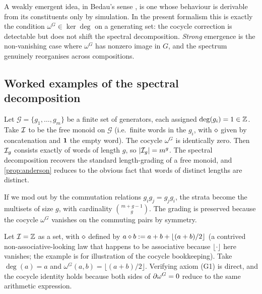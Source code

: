 \begin{remark}
\label{rem:bedau}
A weakly emergent idea, in Bedau's sense \cite{Bedau1997}, is one whose
behaviour is derivable from its constituents only by simulation. In the
present formalism this is exactly the condition $\omega^G \in \ker\deg$
on a generating set: the cocycle correction is detectable but does not
shift the spectral decomposition. \emph{Strong} emergence is the
non-vanishing case where $\omega^G$ has nonzero image in $G$, and the
spectrum genuinely reorganises across compositions.
\end{remark}

\subsection*{Worked examples of the spectral decomposition}

\begin{example}
\label{ex:free-graded}
Let $\mathcal{G} = \{g_1,\dots,g_m\}$ be a finite set of generators,
each assigned $\deg(g_i) = 1\in\mathbb{Z}$. Take $\mathcal{I}$ to be the free monoid
on $\mathcal{G}$ (i.e.\ finite words in the $g_i$, with $\mathbin{\diamond}$ given
by concatenation and $\mathbf{1}$ the empty word). The cocycle
$\omega^G$ is identically zero. Then $\mathcal{I}_g$ consists exactly of
words of length $g$, so $|\mathcal{I}_g| = m^g$. The spectral decomposition
recovers the standard length-grading of a free monoid, and
\cref{prop:anderson} reduces to the obvious fact that words of
distinct lengths are distinct.
\end{example}

\begin{example}\label{ex:free-comm}
If we mod out by the commutation relations $g_i g_j = g_j g_i$, the
strata become the multisets of size $g$, with cardinality
$\binom{m+g-1}{g}$. The grading is preserved because the cocycle
$\omega^G$ vanishes on the commuting pairs by symmetry.
\end{example}

\begin{example}\label{ex:nontrivial-cocycle}
Let $\mathcal{I} = \mathbb{Z}$ as a set, with $\mathbin{\diamond}$ defined by
$a\mathbin{\diamond} b \mathrel{:=} a + b + \lfloor (a + b)/2 \rfloor$ (a contrived
non-associative-looking law that happens to be associative because
$\lfloor\cdot\rfloor$ here vanishes; the example is for illustration of
the cocycle bookkeeping). Take $\deg(a) = a$ and
$\omega^G(a,b) = \lfloor (a+b)/2\rfloor$. Verifying axiom (G1) is
direct, and the cocycle identity holds because both sides of
$\partial\omega^G = 0$ reduce to the same arithmetic
expression.
\end{example}

